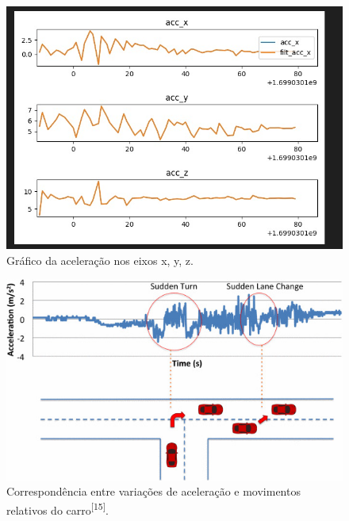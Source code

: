 \begin{figure}[hp]
    \centering
    
    \includegraphics[scale=0.4]{figures/aceleracao.jpg}
    
    \caption{Gráfico da aceleração nos eixos x, y, z.}
    
    \label{fig:aceleracao}
\end{figure}

\begin{figure}[hp]
    \centering
    
    \includegraphics[scale=0.6]{figures/sudden_acc_car.jpg}
    
    \caption{Correspondência entre variações de aceleração e movimentos relativos do carro\textsuperscript{[15]}.}
    
    \label{fig:sudden_acc_car}
\end{figure}

